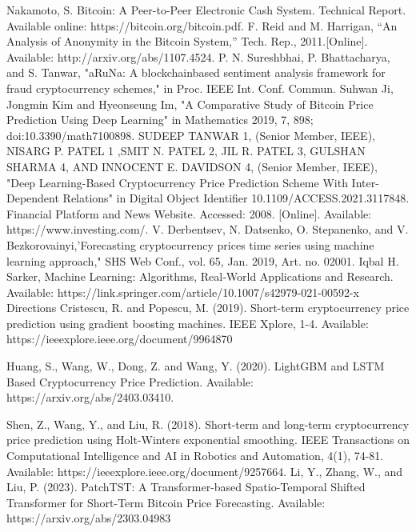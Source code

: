 \documentclass[conference]{IEEEtran}
\begin{document}
\begin{thebibliography}{00}
 Nakamoto, S. Bitcoin: A Peer-to-Peer Electronic Cash System. Technical Report. Available online: https://bitcoin.org/bitcoin.pdf.
 F. Reid and M. Harrigan, “An Analysis of Anonymity in the Bitcoin System,” Tech. Rep., 2011.[Online]. Available: http://arxiv.org/abs/1107.4524.
 P. N. Sureshbhai, P. Bhattacharya, and S. Tanwar, "aRuNa: A blockchainbased sentiment analysis framework for fraud cryptocurrency schemes," in Proc. IEEE Int. Conf. Commun. 
 Suhwan Ji, Jongmin Kim and Hyeonseung Im, "A Comparative Study of Bitcoin Price Prediction Using Deep Learning" in Mathematics 2019, 7, 898; doi:10.3390/math7100898.
 SUDEEP TANWAR 1, (Senior Member, IEEE), NISARG P. PATEL 1
,SMIT N. PATEL 2, JIL R. PATEL 3, GULSHAN SHARMA 4, AND INNOCENT E. DAVIDSON 4, (Senior Member, IEEE), "Deep Learning-Based Cryptocurrency
Price Prediction Scheme With Inter-Dependent Relations" in Digital Object Identifier 10.1109/ACCESS.2021.3117848.
 Financial Platform and News Website. Accessed: 2008. [Online]. Available: https://www.investing.com/.
 V. Derbentsev, N. Datsenko, O. Stepanenko, and V. Bezkorovainyi,'Forecasting cryptocurrency prices time series using machine learning approach," SHS Web Conf., vol. 65, Jan. 2019, Art. no. 02001.
 Iqbal H. Sarker, Machine Learning: Algorithms, Real‑World Applications and Research. Available: https://link.springer.com/article/10.1007/s42979-021-00592-x
Directions
 Cristescu, R. and Popescu, M. (2019). Short-term cryptocurrency price prediction using gradient boosting machines. IEEE Xplore, 1-4. Available: https://ieeexplore.ieee.org/document/9964870

 Huang, S., Wang, W., Dong, Z. and Wang, Y. (2020). LightGBM and LSTM Based Cryptocurrency Price Prediction. Available: https://arxiv.org/abs/2403.03410.

 Shen, Z., Wang, Y., and Liu, R. (2018). Short-term and long-term cryptocurrency price prediction using Holt-Winters exponential smoothing. IEEE Transactions on Computational Intelligence and AI in Robotics and Automation, 4(1), 74-81. Available: https://ieeexplore.ieee.org/document/9257664.
 Li, Y., Zhang, W., and Liu, P. (2023). PatchTST: A Transformer-based Spatio-Temporal Shifted Transformer for Short-Term Bitcoin Price Forecasting. Available: https://arxiv.org/abs/2303.04983

\end{thebibliography}
\vspace{12pt}
\end{document}
